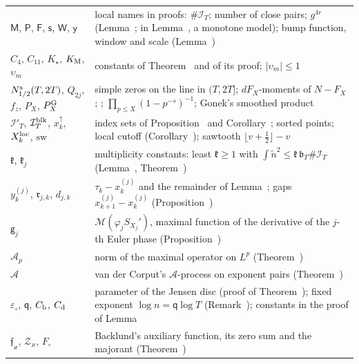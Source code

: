 \documentclass[preprint,12pt]{elsarticle}
\makeatletter
\let\CG@origref\ref
\let\CG@origeqref\eqref
\newcommand{\CG@gettip}[1]{\@ifundefined{CGTip@#1}{Reference: #1}{\csname CGTip@#1\endcsname}}
\DeclareRobustCommand{\CGref}[1]{\pdftooltip{\CG@origref{#1}}{\CG@gettip{#1}}}
\DeclareRobustCommand{\CGeqref}[1]{\pdftooltip{\CG@origeqref{#1}}{\CG@gettip{#1}}}
\numberwithin{equation}{section}
\theoremstyle{plain}
\theoremstyle{definition}
\theoremstyle{remark}
\newcommand{\IT}{\mathcal I_T}
\makeatother
\begin{document}
\begin{center}
\begin{longtable}{p{}p{}}
$\mathsf M$, $\mathsf P$, $\mathsf F$, $\mathsf s$, $\mathsf W$, $\mathsf y$ & local names in proofs: $\#\IT$; number of close pairs; $g^{4r}$ (Lemma~\CGref{lem:sampling_rho}; in Lemma~\CGref{lem:midpoint_rule}, a monotone model); bump function, window and scale (Lemma~\CGref{lem:maximal_primes})\\
$C_4$, $C_{11}$, $K_\star$, $K_{\rm M}$, $\upsilon_m$ & constants of Theorem~\CGref{thm:uniform_iteration} and of its proof; $|\upsilon_m|\le1$\\
$N^{\rm s}_{1/2}(T,2T)$, $Q_{2j}$, $f_z$, $P_X$, $P^{\rm G}_X$ & simple zeros on the line in $(T,2T]$; $dF_X$-moments of $N-F_X$; \CGeqref{eq:f_z}; $\prod_{p\le X}(1-p^{-s})^{-1}$; Gonek's smoothed product\\
$\mathcal I'_T$, $\mathcal I_T^{\rm blk}$, $x^\uparrow_k$, $X^{\rm loc}_k$, $\mathrm{sw}$ & index sets of Proposition~\CGref{prop:monotone} and Corollary~\CGref{cor:sorted_clock}; sorted points; local cutoff (Corollary~\CGref{cor:local_clock}); sawtooth $\lfloor v+\frac12\rfloor-v$\\
$\mathfrak k$, $\mathfrak k_j$ & multiplicity constants: least $\mathfrak k\ge1$ with $\int\tilde n^2\le\mathfrak k\,\mathfrak b_T\#\IT$ (Lemma~\CGref{lem:sampling_rho}, Theorem~\CGref{thm:uniform_iteration})\\
$y^{(j)}_k$, $\mathfrak r_{j,k}$, $d_{j,k}$ & $\tau_k-x^{(j)}_k$ and the remainder of Lemma~\CGref{lem:second_identity}; gaps $x^{(j)}_{k+1}-x^{(j)}_k$ (Proposition~\CGref{prop:deformation})\\
$\mathsf g_j$ & $\mathcal M(\varphi_jS_{X_j}')$, maximal function of the derivative of the $j$-th Euler phase (Proposition~\CGref{prop:recursion})\\
$\mathcal A_p$ & norm of the maximal operator on $L^p$ (Theorem~\CGref{thm:known_maximal})\\
$\mathscr A$ & van der Corput\textquoteright s $\mathscr A$-process on exponent pairs (Theorem~\CGref{thm:known_exponents})\\
$\varepsilon_\circ$, $\mathsf q$, $C_{\rm b}$, $C_{\rm d}$ & parameter of the Jensen disc (proof of Theorem~\CGref{thm:envelope}); fixed exponent $\log n=\mathsf q\log T$ (Remark~\CGref{rem:transport}); constants in the proof of Lemma~\CGref{lem:higher_moments}\\
$\mathfrak f_\varkappa$, $\mathcal Z_\varkappa$, $F_\circ$ & Backlund's auxiliary function, its zero sum and the majorant (Theorem~\CGref{thm:known_backlund})\\
\end{longtable}
\end{center}
\end{document}
